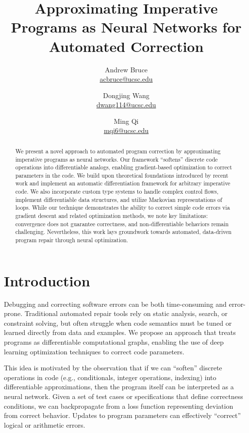 \documentclass{article}
\title{Approximating Imperative Programs as Neural Networks for Automated Correction}
\author{
Andrew Bruce \\ \href{mailto:acbruce@ucsc.edu}{acbruce@ucsc.edu}
\and
Dongjing Wang \\ \href{mailto:dwang114@ucsc.edu}{dwang114@ucsc.edu}
\and
Ming Qi \\ \href{mailto:mqi6@ucsc.edu}{mqi6@ucsc.edu}
}
\begin{document}
\maketitle

\begin{abstract}
We present a novel approach to automated program correction by approximating imperative programs as neural networks. Our framework ``softens'' discrete code operations into differentiable analogs, enabling gradient-based optimization to correct parameters in the code. We build upon theoretical foundations introduced by recent work and implement an automatic differentiation framework for arbitrary imperative code. We also incorporate custom type systems to handle complex control flows, implement differentiable data structures, and utilize Markovian representations of loops. While our technique demonstrates the ability to correct simple code errors via gradient descent and related optimization methods, we note key limitations: convergence does not guarantee correctness, and non-differentiable behaviors remain challenging. Nevertheless, this work lays groundwork towards automated, data-driven program repair through neural optimization.
\end{abstract}

\section{Introduction}
Debugging and correcting software errors can be both time-consuming and error-prone. Traditional automated repair tools rely on static analysis, search, or constraint solving, but often struggle when code semantics must be tuned or learned directly from data and examples. We propose an approach that treats programs as differentiable computational graphs, enabling the use of deep learning optimization techniques to correct code parameters.

This idea is motivated by the observation that if we can ``soften'' discrete operations in code (e.g., conditionals, integer operations, indexing) into differentiable approximations, then the program itself can be interpreted as a neural network. Given a set of test cases or specifications that define correctness conditions, we can backpropagate from a loss function representing deviation from correct behavior. Updates to program parameters can effectively ``correct'' logical or arithmetic errors.
\end{document}
